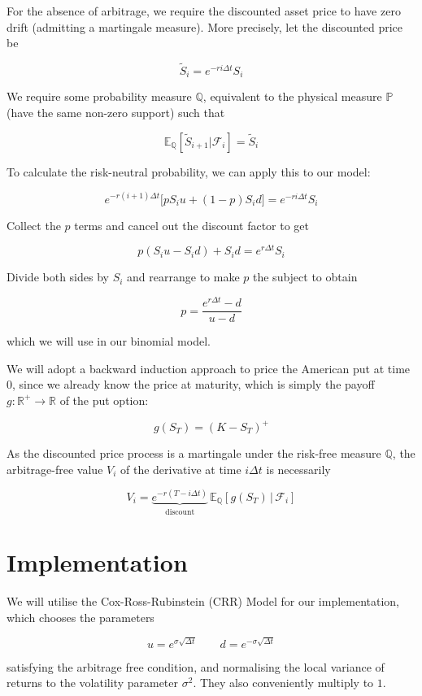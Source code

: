 For the absence of arbitrage, we require the discounted asset price to have zero drift (admitting a martingale measure). More precisely, let the discounted price be

$$
\tilde S_i = e^{-ri\Delta t} S_i
$$

We require some probability measure $\mathbb Q$, equivalent to the physical measure $\mathbb P$ (have the same non-zero support) such that

$$
\mathbb E_\mathbb Q [\tilde S_{i+1} | \mathcal F_i] = \tilde S_i
$$

To calculate the risk-neutral probability, we can apply this to our model:

$$
e^{-r(i+1)\Delta t}\big[pS_i u + (1-p)S_i d \big] = e^{-ri\Delta t}S_i
$$

Collect the $p$ terms and cancel out the discount factor to get

$$
p(S_i u - S_i d) + S_i d = e^{r\Delta t} S_i
$$

Divide both sides by $S_i$ and rearrange to make $p$ the subject to obtain

$$
p = \frac{e^{r \Delta t} -d}{u-d}
$$

which we will use in our binomial model.

We will adopt a backward induction approach to price the American put at time $0$, since we already know the price at maturity, which is simply the payoff $g: \mathbb R^+ \to \mathbb R$ of the put option:

$$
g(S_T) = (K - S_T)^+
$$

As the discounted price process is a martingale under the risk-free measure $\mathbb Q$, the arbitrage-free value $V_i$ of the derivative at time $i \Delta t$ is necessarily

$$
V_i = \underbrace{e^{-r(T-i\Delta t)}}_\text{discount} \,\mathbb E_\mathbb Q[g(S_T)\,|\,\mathcal F_i]
$$


\section{Implementation}

We will utilise the Cox-Ross-Rubinstein (CRR) Model \cite{cox1979option} for our implementation, which chooses the parameters

$$
u = e^{\sigma \sqrt{\Delta t}}\qquad d = e^{-\sigma \sqrt{\Delta t}}
$$

satisfying the arbitrage free condition, and normalising the local variance of returns to the volatility parameter $\sigma^2$. They also conveniently multiply to $1$.


